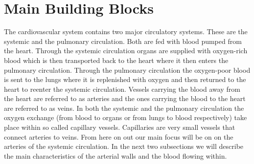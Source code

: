 \documentclass[a4paper, oneside]{discothesis}
\begin{document}
\section{Main Building Blocks} \label{mbb}
The cardiovascular system contains two major circulatory systems.
These are the systemic and the pulmonary circulation. 
Both are fed with blood pumped from the heart.
Through the systemic circulation organs are supplied with oxygen-rich blood which is then transported back to the heart where it then enters the pulmonary circulation.
Through the pulmonary circulation the oxygen-poor blood is sent to the lungs where it is replenished with oxygen and then returned to the heart to reenter the systemic circulation.
Vessels carrying the blood away from the heart are referred to as arteries and the ones carrying the blood to the heart are referred to as veins.
In both the systemic and the pulmonary circulation the oxygen exchange (from blood to organs or from lungs to blood respectively) take place within so called capillary vessels.
Capillaries are very small vessels that connect arteries to veins.
From here on out our main focus will be on on the arteries of the systemic circulation. 
In the next two subsections we will describe the main characteristics of the arterial walls and the blood flowing within.
\end{document}
